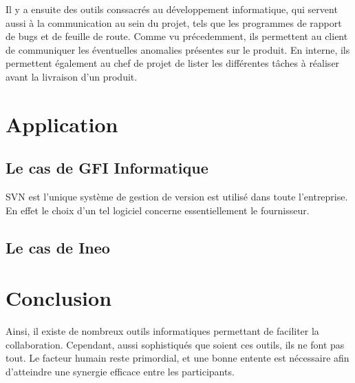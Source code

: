 Il y a ensuite des outils conssacrés au développement informatique, qui servent aussi à la communication au sein du projet, tels que les programmes de rapport de bugs et de feuille de route. Comme vu précedemment, ils permettent au client de communiquer les éventuelles anomalies présentes sur le produit. En interne, ils permettent également au chef de projet de lister les différentes tâches à réaliser avant la livraison d'un produit.

\section{Application}

\subsection{Le cas de GFI Informatique}

SVN est l'unique système de gestion de version est utilisé dans toute l'entreprise. En effet le choix d'un tel logiciel concerne essentiellement le fournisseur.

\subsection{Le cas de Ineo}

\section{Conclusion}

Ainsi, il existe de nombreux outils informatiques permettant de faciliter la collaboration. Cependant, aussi sophistiqués que soient ces outils, ils ne font pas tout. Le facteur humain reste primordial, et une bonne entente est nécessaire afin d’atteindre une synergie efficace entre les participants.

